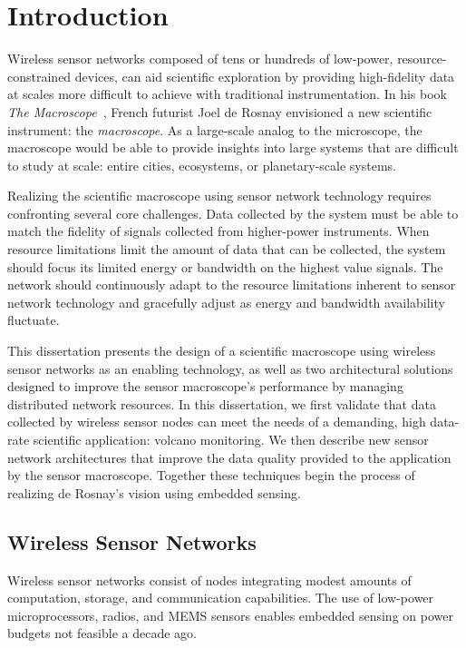 \chapter{Introduction}
\label{chap-introduction}

Wireless sensor networks composed of tens or hundreds of low-power,
resource-constrained devices, can aid scientific exploration by providing
high-fidelity data at scales more difficult to achieve with traditional
instrumentation. In his book \textit{The Macroscope}~\cite{rosnay79}, French
futurist Joel de Rosnay envisioned a new scientific instrument: the
\textit{macroscope}. As a large-scale analog to the microscope, the
macroscope would be able to provide insights into large systems that are
difficult to study at scale: entire cities, ecosystems, or planetary-scale
systems.

Realizing the scientific macroscope using sensor network technology requires
confronting several core challenges. Data collected by the system must be
able to match the fidelity of signals collected from higher-power
instruments. When resource limitations limit the amount of data that can be
collected, the system should focus its limited energy or bandwidth on the
highest value signals. The network should continuously adapt to the resource
limitations inherent to sensor network technology and gracefully adjust as
energy and bandwidth availability fluctuate.

This dissertation presents the design of a scientific macroscope using
wireless sensor networks as an enabling technology, as well as two
architectural solutions designed to improve the sensor macroscope's
performance by managing distributed network resources. In this dissertation,
we first validate that data collected by wireless sensor nodes can meet the
needs of a demanding, high data-rate scientific application: volcano
monitoring. We then describe new sensor network architectures that improve
the data quality provided to the application by the sensor macroscope.
Together these techniques begin the process of realizing de Rosnay's vision
using embedded sensing.

\section{Wireless Sensor Networks}

Wireless sensor networks consist of nodes integrating modest amounts of
computation, storage, and communication capabilities. The use of low-power
microprocessors, radios, and MEMS sensors enables embedded sensing on power
budgets not feasible a decade ago.

